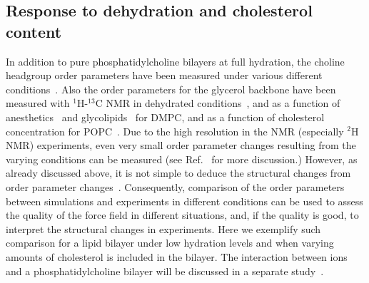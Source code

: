 \documentclass[journal=jpcbfk,manuscript=article]{achemso}
\begin{document}
\subsection{Response to dehydration and cholesterol content}
In addition to pure phosphatidylcholine bilayers at full hydration, the choline headgroup order parameters
have been measured under various different conditions~\cite{gally75,brown77,brown78,akutsu81,altenbach84,scherer89,bechinger91,ulrich94,dvinskikh05b,castro08,kapla12,ferreira13}.
Also the order parameters for the glycerol backbone have been measured with $^1$H-$^{13}$C NMR in dehydrated conditions~\cite{dvinskikh05b}, and as a function 
of anesthetics~\cite{castro08} and glycolipids~\cite{kapla12} for DMPC, and as a function of cholesterol 
concentration for POPC~\cite{ferreira13}. Due to the high resolution in the NMR (especially $^2$H NMR) experiments,
even very small order parameter changes resulting from the varying conditions can be measured 
(see Ref.~ for more discussion.) 
However, as already discussed above, it is not simple to deduce 
the structural changes from order parameter changes~\cite{akutsu91,semchyschyn04}. Consequently, comparison of the order parameters
between simulations and experiments in different conditions can be used to assess the quality of the force field 
in different situations, and, if the quality is good, to interpret the structural changes in experiments.
Here we exemplify such comparison for a lipid bilayer under low hydration levels and when varying amounts of cholesterol is included in the bilayer. 
The interaction between ions and a phosphatidylcholine bilayer will be discussed in a separate study~\cite{ionpaper}.
\end{document}
